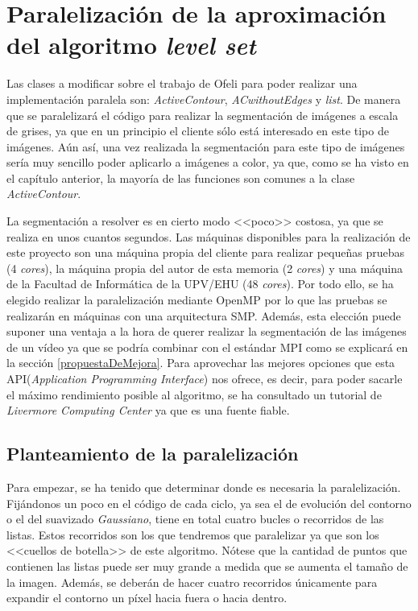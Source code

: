 \chapter{Paralelizaci\'{o}n de la aproximaci\'{o}n del algoritmo \textit{level set}}

Las clases a modificar sobre el trabajo de Ofeli \cite{ofeli} para poder realizar una implementaci\'{o}n paralela son: \textit{ActiveContour}, \textit{ACwithoutEdges} y \textit{list}. De manera que se paralelizar\'{a} el c\'{o}digo para realizar la segmentaci\'{o}n de im\'{a}genes a escala de grises, ya que en un principio el cliente s\'{o}lo est\'{a} interesado en este tipo de im\'{a}genes. A\'{u}n as\'{i}, una vez realizada la segmentaci\'{o}n para este tipo de im\'{a}genes ser\'{i}a muy sencillo poder aplicarlo a im\'{a}genes a color, ya que, como se ha visto en el cap\'{i}tulo anterior, la mayor\'{i}a de las funciones son comunes a la clase \textit{ActiveContour}. 

La segmentaci\'{o}n a resolver es en cierto modo <<poco>> costosa, ya que se realiza en unos cuantos segundos. Las m\'{a}quinas disponibles para la realizaci\'{o}n de este proyecto son una m\'{a}quina propia del cliente  para realizar peque\~{n}as pruebas (4 \textit{cores}), la m\'{a}quina propia del autor de esta memoria (2 \textit{cores}) y una m\'{a}quina de la Facultad de Inform\'{a}tica de la UPV/EHU (48 \textit{cores}). Por todo ello, se ha elegido realizar la paralelizaci\'{o}n mediante  OpenMP\cite{openmp} por lo que las pruebas se realizar\'{a}n en m\'{a}quinas con una arquitectura SMP. Adem\'{a}s, esta elecci\'{o}n puede suponer una ventaja a la hora de querer realizar la segmentaci\'{o}n de las im\'{a}genes de un v\'{i}deo ya que se podr\'{i}a combinar con el est\'{a}ndar MPI como se explicar\'{a} en la secci\'{o}n \ref{propuestaDeMejora}. Para aprovechar las mejores opciones que esta API(\textit{Application Programming Interface}) nos ofrece, es decir, para poder sacarle el m\'{a}ximo rendimiento posible al algoritmo, se ha consultado un tutorial de \textit{Livermore Computing Center} \cite{live1} ya que es una fuente fiable.

\section{Planteamiento de la paralelizaci\'{o}n}

Para empezar, se ha tenido que determinar donde es necesaria la paralelizaci\'{o}n. Fij\'{a}ndonos un poco en el c\'{o}digo de cada ciclo, ya sea el de evoluci\'{o}n del contorno o el del suavizado \textit{Gaussiano}, tiene en total cuatro bucles o recorridos de las listas. Estos recorridos son los que tendremos que paralelizar ya que son los <<cuellos de botella>> de este algoritmo. N\'{o}tese que la cantidad de puntos que contienen las listas puede ser muy grande a medida que se aumenta el tama\~{n}o de la imagen. Adem\'{a}s, se deber\'{a}n de hacer cuatro recorridos \'{u}nicamente para expandir el contorno un p\'{i}xel hacia fuera o hacia dentro. 


